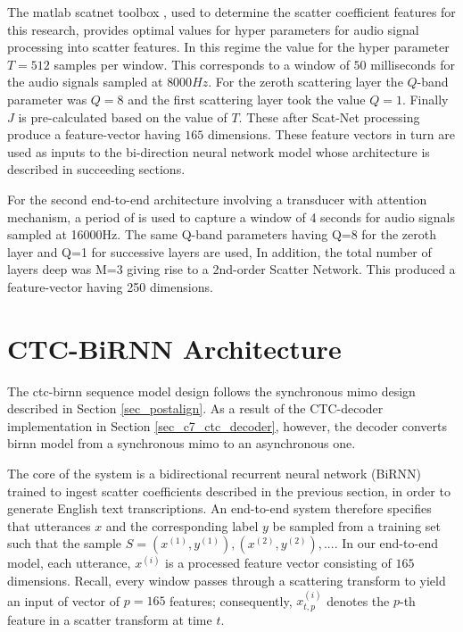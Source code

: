 The matlab scatnet toolbox \citep{anden2014scatnet}, used to determine the scatter coefficient features for this research, provides optimal values for hyper parameters for audio signal processing into scatter features.  In this regime the value for the hyper parameter $T=512$ samples per window. This corresponds to a window of $50$ milliseconds for the audio signals sampled at $8000 Hz$.  For the zeroth scattering layer the $Q$-band parameter was $Q=8$ and the first scattering layer took the value  $Q=1$.  Finally $J$ is pre-calculated based on the value of $T$.  These after Scat-Net processing produce a feature-vector having $165$ dimensions.  These feature vectors in turn are used as inputs to the bi-direction neural network model whose architecture is described in succeeding sections.

For the second end-to-end architecture involving a transducer with attention mechanism, a period of  is used to capture a window of 4 seconds for audio signals sampled at 16000Hz. The same Q-band parameters having Q=8 for the zeroth layer and Q=1 for successive layers are used, In addition, the total number of layers deep was M=3 giving rise to a 2nd-order Scatter Network. This produced a feature-vector having 250 dimensions.

\section{CTC-BiRNN Architecture}\label{sec_c7_birnn}

The \acrshort{ctc}-\acrshort{birnn} sequence model design follows the synchronous \acrshort{mimo} design described in Section \ref{sec_postalign}. As a result of the CTC-decoder implementation in Section \ref{sec_c7_ctc_decoder}, however, the decoder converts \acrshort{birnn} model from a synchronous \acrshort{mimo} to an asynchronous one.

The core of the system is a bidirectional recurrent neural network (BiRNN) trained to ingest scatter coefficients described in the previous section, in order to generate English text transcriptions.  An end-to-end system therefore specifies that utterances $x$ and the corresponding label $y$ be sampled from a training set such that the sample $S = {(x^{(1)}, y^{(1)}), (x^{(2)}, y^{(2)}), . . .}$.   In our end-to-end model, each utterance, $x^{(i)}$ is a processed feature vector consisting of $165$ dimensions.  Recall, every window passes through a scattering transform to yield an input of vector of $p=165$ features; consequently,   $x^{(i)}_{t,p}$ denotes the $p$-th feature in a scatter transform at time $t$.  

